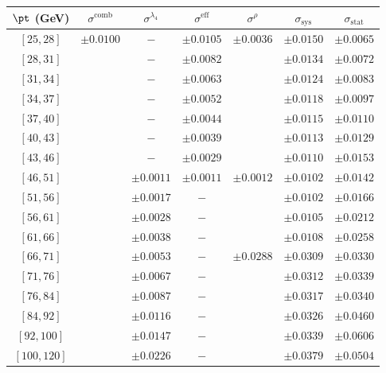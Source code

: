 \begin{tabular}{c||c|c|c|c||c|c}
$\pt$ (GeV) & $\sigma^{\text{comb}}$ & $\sigma^{\lambda_4}$ & $\sigma^{\text{eff}}$ & $\sigma^\rho$ & $\sigma_{\text{sys}}$ & $\sigma_{\text{stat}}$ \\
\hline
$[25, 28]$ & \multirow{17}{*}{$\pm0.0100$} & $-$ & $\pm0.0105$ & \multirow{7}{*}{$\pm0.0036$} & $\pm0.0150$ & $\pm0.0065$\\
$[28, 31]$ &  & $-$ & $\pm0.0082$ &  & $\pm0.0134$ & $\pm0.0072$\\
$[31, 34]$ &  & $-$ & $\pm0.0063$ &  & $\pm0.0124$ & $\pm0.0083$\\
$[34, 37]$ &  & $-$ & $\pm0.0052$ &  & $\pm0.0118$ & $\pm0.0097$\\
$[37, 40]$ &  & $-$ & $\pm0.0044$ &  & $\pm0.0115$ & $\pm0.0110$\\
$[40, 43]$ &  & $-$ & $\pm0.0039$ &  & $\pm0.0113$ & $\pm0.0129$\\
$[43, 46]$ &  & $-$ & $\pm0.0029$ &  & $\pm0.0110$ & $\pm0.0153$\\\cline{5-5}
$[46, 51]$ &  & $\pm0.0011$ & $\pm0.0011$ & \multirow{4}{*}{$\pm0.0012$} & $\pm0.0102$ & $\pm0.0142$\\
$[51, 56]$ &  & $\pm0.0017$ & $-$ &  & $\pm0.0102$ & $\pm0.0166$\\
$[56, 61]$ &  & $\pm0.0028$ & $-$ &  & $\pm0.0105$ & $\pm0.0212$\\
$[61, 66]$ &  & $\pm0.0038$ & $-$ &  & $\pm0.0108$ & $\pm0.0258$\\\cline{5-5}
$[66, 71]$ &  & $\pm0.0053$ & $-$ & \multirow{6}{*}{$\pm0.0288$} & $\pm0.0309$ & $\pm0.0330$\\
$[71, 76]$ &  & $\pm0.0067$ & $-$ &  & $\pm0.0312$ & $\pm0.0339$\\
$[76, 84]$ &  & $\pm0.0087$ & $-$ &  & $\pm0.0317$ & $\pm0.0340$\\
$[84, 92]$ &  & $\pm0.0116$ & $-$ &  & $\pm0.0326$ & $\pm0.0460$\\
$[92, 100]$ &  & $\pm0.0147$ & $-$ &  & $\pm0.0339$ & $\pm0.0606$\\
$[100, 120]$ &  & $\pm0.0226$ & $-$ &  & $\pm0.0379$ & $\pm0.0504$\\
\end{tabular}
